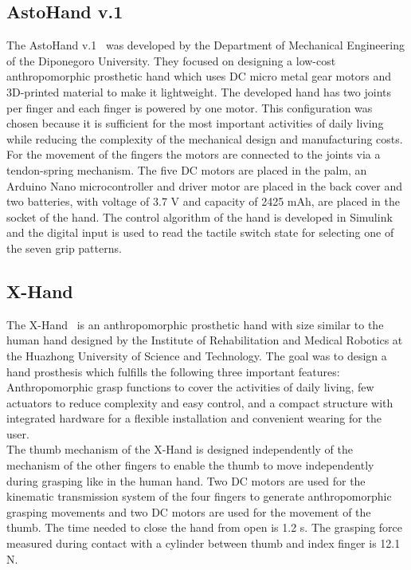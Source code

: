 \documentclass[a4paper, 10pt, conference]{ieeeconf}      %
\begin{document}
\subsection{AstoHand v.1}

The AstoHand v.1~\cite{astohand} was developed by the Department of Mechanical Engineering of the Diponegoro University. They focused on designing a low-cost anthropomorphic prosthetic hand which uses DC micro metal gear motors and 3D-printed material to make it lightweight. The developed hand has two joints per finger and each finger is powered by one motor. This configuration was chosen because it is sufficient for the most important activities of daily living while reducing the complexity of the mechanical design and manufacturing costs. For the movement of the fingers the motors are connected to the joints via a tendon-spring mechanism. The five DC motors are placed in the palm, an Arduino Nano microcontroller and driver motor are placed in the back cover and two batteries, with voltage of 3.7 V and capacity of 2425 mAh, are placed in the socket of the hand. The control algorithm of the hand is developed in Simulink and the digital input is used to read the tactile switch state for selecting one of the seven grip patterns.

\subsection{X-Hand}

The X-Hand~\cite{xhand} is an anthropomorphic prosthetic hand with size similar to the human hand designed by the Institute of Rehabilitation and Medical Robotics at the Huazhong University of Science and Technology. The goal was to design a hand prosthesis which fulfills the following three important features: Anthropomorphic grasp functions to cover the activities of daily living, few actuators to reduce complexity and easy control, and a compact structure with integrated hardware for a flexible installation and convenient wearing for the user.\\
The thumb mechanism of the X-Hand is designed independently of the mechanism of the other fingers to enable the thumb to move independently during grasping like in the human hand. Two DC motors are used for the kinematic transmission system of the four fingers to generate anthropomorphic grasping movements and two DC motors are used for the movement of the thumb. The time needed to close the hand from open is 1.2 s. The grasping force measured during contact with a cylinder between thumb and index finger is 12.1 N.
\end{document}

